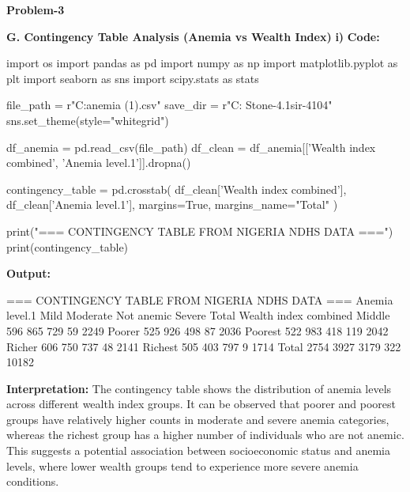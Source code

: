 \documentclass[12pt,a4paper]{article}
\begin{document}
\begin{center}
\Large \textbf{Problem-3}
\end{center}
\textbf{G. Contingency Table Analysis (Anemia vs Wealth Index)}
\textbf{i)}
\textbf{Code:}
\begin{codebox}
import os
import pandas as pd
import numpy as np
import matplotlib.pyplot as plt
import seaborn as sns
import scipy.stats as stats

file_path = r"C:\Users\hp\Downloads\children anemia (1).csv"
save_dir = r"C:\Users\hp\OneDrive\Desktop
\Reality Stone-4.1\Siddik sir-4104"
sns.set_theme(style="whitegrid")

df_anemia = pd.read_csv(file_path)
df_clean = df_anemia[['Wealth index combined', 
'Anemia level.1']].dropna()

contingency_table = pd.crosstab(
    df_clean['Wealth index combined'],
    df_clean['Anemia level.1'],
    margins=True, margins_name="Total"
)

print("=== CONTINGENCY TABLE FROM NIGERIA NDHS DATA ===")
print(contingency_table)
\end{codebox}

\textbf{Output:}
\begin{codebox}
=== CONTINGENCY TABLE FROM NIGERIA NDHS DATA ===
Anemia level.1      Mild  Moderate  Not anemic  Severe  Total
Wealth index combined
Middle               596       865          729      59   2249
Poorer               525       926          498      87   2036
Poorest              522       983          418     119   2042
Richer               606       750          737      48   2141
Richest              505       403          797       9   1714
Total               2754      3927         3179     322  10182
\end{codebox}

\textbf{Interpretation:}
The contingency table shows the distribution of anemia levels across different wealth index groups.
It can be observed that poorer and poorest groups have relatively higher counts in moderate and severe anemia categories, whereas the richest group has a higher number of individuals who are not anemic.
This suggests a potential association between socioeconomic status and anemia levels, where lower wealth groups tend to experience more severe anemia conditions.
\end{document}

